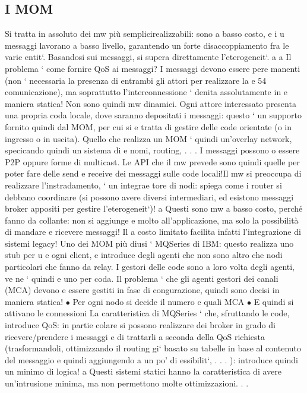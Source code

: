 \documentclass[a4paper,12pt]{article}
\begin{document}
\subsection{I MOM}
Si tratta in assoluto dei mw più semplicirealizzabili: sono a basso costo, e i
u
messaggi lavorano a basso livello, garantendo un forte disaccoppiamento fra le
varie entit`. Basandosi sui messaggi, si supera direttamente l'eterogeneit`.
a
a
Il problema ` come fornire QoS ai messaggi? I messaggi devono essere pere
manenti (non ` necessaria la presenza di entrambi gli attori per realizzare la
e
54
comunicazione), ma soprattutto l'interconnessione ` denita assolutamente in
e
maniera statica! Non sono quindi mw dinamici.
Ogni attore interessato presenta una propria coda locale, dove saranno depositati i messaggi: questo ` un supporto
fornito quindi dal MOM, per cui si
e
tratta di gestire delle code orientate (o in ingresso o in uscita). Quello che realizza un MOM ` quindi un'overlay
network, specicando quindi un sistema di
e
nomi, routing, . . .
I messaggi possono o essere P2P oppure forme di multicast. Le API che il
mw prevede sono quindi quelle per poter fare delle send e receive dei messaggi
sulle code locali!Il mw si preoccupa di realizzare l'instradamento, ` un integrae
tore di nodi: spiega come i router si debbano coordinare (si possono avere diversi
intermediari, ed esistono messaggi broker appositi per gestire l'eterogeneit`)!
a
Questi sono mw a basso costo, perché fanno da collante: non si aggiunge
e
molto all'applicazione, ma solo la possibilità di mandare e ricevere messaggi! Il
a
costo limitato facilita infatti l'integrazione di sistemi legacy!
Uno dei MOM più diusi ` MQSeries di IBM: questo realizza uno stub per
u
e
ogni client, e introduce degli agenti che non sono altro che nodi particolari che
fanno da relay. I gestori delle code sono a loro volta degli agenti, ve ne ` quindi
e
uno per coda. Il problema ` che gli agenti gestori dei canali (MCA) devono
e
essere gestiti in fase di congurazione, quindi sono decisi in maniera statica!
$\bullet$ Per ogni nodo si decide il numero e quali MCA
$\bullet$ E quindi si attivano le connessioni
La caratteristica di MQSeries ` che, sfruttando le code, introduce QoS: in partie
colare si possono realizzare dei broker in grado di ricevere/prendere i messaggi e
di trattarli a seconda della QoS richiesta (trasformandoli, ottimizzando il routing gi` basato su tabelle in base al
contenuto del messaggio e quindi aggiungendo
a
un po' di essibilit`, . . . ): introduce quindi un minimo di logica!
a
Questi sistemi statici hanno la caratteristica di avere un'intrusione minima,
ma non permettono molte ottimizzazioni. . .
\end{document}
